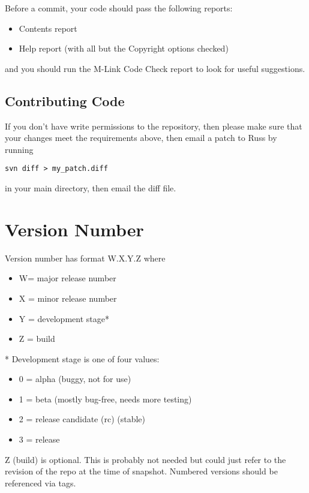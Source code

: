   Before a commit, your code should pass the following reports:
\begin{itemize}
 \item Contents report
  \item  Help report  (with all but the Copyright options checked)
\end{itemize}
  and you should run the M-Link Code Check report to look for useful suggestions.

\subsection{Contributing Code}

If you don't have write permissions to the repository, then please make sure that your changes meet the requirements above, then email a patch to Russ by running 
\begin{lstlisting}
svn diff > my_patch.diff
\end{lstlisting}
in your main \robotlib directory, then email the diff file.

\section{Version Number}

Version number has format W.X.Y.Z where
\begin{itemize}
\item W= major release number
\item X = minor release number
\item Y = development stage*
\item Z = build
\end{itemize}
* Development stage is one of four values:
\begin{itemize}
\item 0 = alpha (buggy, not for use)
\item 1 = beta (mostly bug-free, needs more testing)
\item 2 = release candidate (rc) (stable)
\item 3 = release
\end{itemize}
Z (build) is optional. This is probably not needed but could just refer to the revision of the repo at the time of snapshot. Numbered versions should be referenced via tags.
